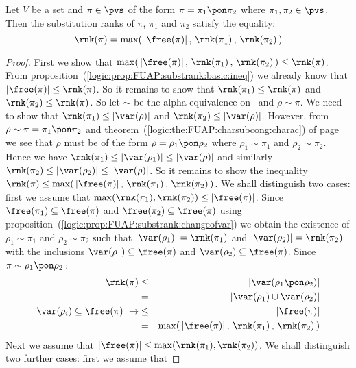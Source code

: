 \begin{prop}\label{logic:prop:FUAP:substrank:recursion:pon}
Let $V$ be a set and $\pi\in\pvs$ of the form
$\pi=\pi_{1}\pon\pi_{2}$ where $\pi_{1},\pi_{2}\in\pvs$. Then the
substitution ranks of $\pi$, $\pi_{1}$ and $\pi_{2}$ satisfy the
equality:
    \[
    \rnk(\pi)=\max(\,|\free(\pi)|\,,\,\rnk(\pi_{1})\,,\,\rnk(\pi_{2})\,)
    \]
\end{prop}
\begin{proof}
First we show that
$\max(\,|\free(\pi)|\,,\,\rnk(\pi_{1})\,,\,\rnk(\pi_{2})\,)\leq\rnk(\pi)$.
From proposition~(\ref{logic:prop:FUAP:substrank:basic:ineq}) we
already know that $|\free(\pi)|\leq\rnk(\pi)$. So it remains to show
that $\rnk(\pi_{1})\leq\rnk(\pi)$ and $\rnk(\pi_{2})\leq\rnk(\pi)$.
So let $\sim$ be the alpha equivalence on \pvs\ and
$\rho\sim\pi$. We need to show that $\rnk(\pi_{1})\leq|\var(\rho)|$
and $\rnk(\pi_{2})\leq|\var(\rho)|$. However, from
$\rho\sim\pi=\pi_{1}\pon\pi_{2}$ and
theorem~(\ref{logic:the:FUAP:charsubcong:charac}) of
page~\pageref{logic:the:FUAP:charsubcong:charac} we see that $\rho$
must be of the form $\rho=\rho_{1}\pon\rho_{2}$ where
$\rho_{1}\sim\pi_{1}$ and $\rho_{2}\sim\pi_{2}$. Hence we have
$\rnk(\pi_{1})\leq|\var(\rho_{1})|\leq|\var(\rho)|$ and similarly
$\rnk(\pi_{2})\leq|\var(\rho_{2})|\leq|\var(\rho)|$. So it remains
to show the inequality
$\rnk(\pi)\leq\max(\,|\free(\pi)|\,,\,\rnk(\pi_{1})\,,\,\rnk(\pi_{2})\,)$.
We shall distinguish two cases: first we assume that
$\max(\rnk(\pi_{1}),\rnk(\pi_{2}))\leq|\free(\pi)|$. Since
$\free(\pi_{1})\subseteq\free(\pi)$ and
$\free(\pi_{2})\subseteq\free(\pi)$ using
proposition~(\ref{logic:prop:FUAP:substrank:changeofvar}) we obtain
the existence of $\rho_{1}\sim\pi_{1}$ and $\rho_{2}\sim\pi_{2}$
such that $|\var(\rho_{1})|=\rnk(\pi_{1})$ and
$|\var(\rho_{2})|=\rnk(\pi_{2})$ with the inclusions
$\var(\rho_{1})\subseteq\free(\pi)$ and
$\var(\rho_{2})\subseteq\free(\pi)$. Since
$\pi\sim\rho_{1}\pon\rho_{2}$\,:
    \begin{eqnarray*}
    \rnk(\pi)&\leq&|\var(\rho_{1}\pon\rho_{2})|\\
    &=&|\var(\rho_{1})\cup\var(\rho_{2})|\\
    \var(\rho_{i})\subseteq\free(\pi)\ \rightarrow&\leq&|\free(\pi)|\\
    &=&\max(\,|\free(\pi)|\,,\,\rnk(\pi_{1})\,,\,\rnk(\pi_{2})\,)
    \end{eqnarray*}
Next we assume that
$|\free(\pi)|\leq\max(\rnk(\pi_{1}),\rnk(\pi_{2}))$. We shall
distinguish two further cases: first we assume that

\end{proof}
